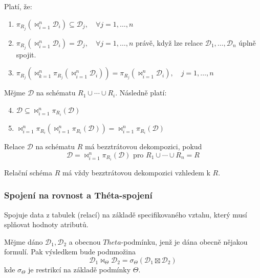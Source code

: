 \begin{upquote}
Platí, že:
\begin{enumerate}
\item $\pi_{R_{j}} (\Join_{i = 1}^{n} \mathcal{D}_{i}) \subseteq \mathcal{D}_{j}, \quad \forall j = 1, \ldots, n$
\item $\pi_{R_{j}} (\Join_{i = 1}^{n} \mathcal{D}_{i}) = \mathcal{D}_{j}, \quad \forall j = 1, \ldots, n$ právě, když lze relace $\mathcal{D}_{1}, \ldots, \mathcal{D}_{n}$ úplně spojit.
\item $\pi_{R_{j}} (\Join_{k = 1}^{n} \pi_{R_{j}} (\Join_{i = 1}^{n} \mathcal{D}_{i})) = \pi_{R_{j}} (\Join_{i = 1}^{n} \mathcal{D}_{i}), \quad j = 1, \ldots, n$
\end{enumerate}
Mějme $\mathcal{D}$ na schématu $R_{1} \cup \cdots \cup R_{i}$. Následně platí:
\begin{enumerate}
\setcounter{enumi}{3}
\item $\mathcal{D} \subseteq \Join_{i = 1}^{n} \pi_{R_{i}} (\mathcal{D})$
\item $\Join_{i = 1}^{n} \pi_{R_{i}} (\Join_{i = 1}^{n} \pi_{R_{i}} (\mathcal{D})) = \Join_{i = 1}^{n} \pi_{R_{i}} (\mathcal{D}) $
\end{enumerate}
\end{upquote}
\begin{uptheorem}
Relace $\mathcal{D}$ na schématu $R$ má bezztrátovou dekompozici, pokud
$$
\mathcal{D} = \Join_{i = 1}^{n} \pi_{R_{i}} (\mathcal{D}) \text{ pro } R_{1} \cup \cdots \cup R_{n} = R
$$
\end{uptheorem}
\begin{upnote}
Relační schéma $R$ má vždy bezztrátovou dekompozici vzhledem k $R$.
\end{upnote}

\subsubsection{Spojení na rovnost a Théta-spojení}
Spojuje data z tabulek (relací) na základě specifikovaného vztahu, který musí splňovat hodnoty atributů.

Mějme dáno $\mathcal{D}_{1}, \mathcal{D}_{2}$ a obecnou $Theta$-podmínku, jenž je dána obecně nějakou formulí. Pak výsledkem bude podmnožina
$$
\mathcal{D}_{1} \Join_{\Theta} \mathcal{D}_{2} = \sigma_{\Theta} (\mathcal{D}_{1} \boxtimes \mathcal{D}_{2})
$$
kde $\sigma_{\Theta}$ je restrikcí na základě podmínky $\Theta$.

